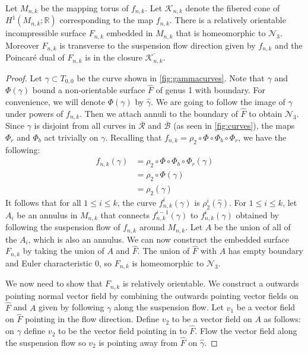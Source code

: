\begin{prop}
\label{lem:genus3}
Let $M_{n,k}$ be the mapping torus of $f_{n,k}$. Let $\mathcal{K}_{n,k}$ denote the fibered cone of
$H^1(M_{n,k};\mathbb{R})$ corresponding to the map $f_{n,k}$.
There is a relatively orientable incompressible surface $F_{n,k}$ embedded in $M_{n,k}$ that is homeomorphic to $\mathcal{N}_3$.
Moreover $F_{n,k}$ is transverse to the suspension flow direction given by $f_{n,k}$ and the Poincar\'e dual of $F_{n,k}$ is in
the closure $\overline{\mathcal{K}_{n,k}}$.
\end{prop}
\begin{proof}
  Let $\gamma \subset T_{0,0}$ be the curve shown in \autoref{fig:gammacurves}. Note that $\gamma$ and $\Phi(\gamma)$ bound a non-orientable surface
  $\widehat{F}$ of genus 1 with boundary. For convenience, we will denote $\Phi(\gamma)$ by $\widehat{\gamma}$. We are going to follow the image of $\gamma$
  under powers of $f_{n,k}$.  Then we attach annuli to the
  boundary of $\widehat{F}$ to obtain $\mathcal{N}_3$. Since $\gamma$ is disjoint from all curves in $\overline{\mathcal{R}}$ and $\overline{\mathcal{B}}$ (as seen in \autoref{fig:curves}), the maps $\Phi_r$ and $\Phi_b$ act trivially on $\gamma$.  Recalling that $f_{n,k}=\rho_2\circ\Phi\circ\Phi_b\circ\Phi_r$, we have the following:
  \begin{align*}
    f_{n,k}(\gamma) &= \rho_2 \circ \Phi \circ \Phi_b \circ \Phi_r(\gamma) \\
                    &= \rho_2 \circ \Phi(\gamma) \\
                    &= \rho_2(\widehat{\gamma}) 
  \end{align*}
  It follows that for all $1\leq i\leq k$, the curve $f_{n,k}^i(\gamma)$ is $\rho_2^i(\widehat{\gamma})$.
  For $1\leq i\leq k$, let $A_i$ be an annulus in $M_{n,k}$ that connects $f_{n,k}^{i-1}(\gamma)$ to $f_{n,k}^i(\gamma)$ obtained by following the suspension
  flow of $f_{n,k}$ around $M_{n,k}$. Let $A$ be the union of all of the $A_i$, which is also an annulus.  We can now construct the embedded surface $F_{n,k}$ by taking the union of
  $A$ and $\widehat{F}$. The union of $\widehat{F}$ with $A$ has empty boundary and Euler characteristic 0, so $F_{n,k}$ is homeomorphic to $\mathcal{N}_3$.


  We now need to show that $F_{n,k}$ is relatively orientable. We construct a outwards pointing normal vector field by combining the outwards pointing vector fields on $\widehat{F}$ and $A$ given by following $\gamma$ along the suspension flow.  Let $v_1$ be a vector field on $\widehat{F}$ pointing in the flow direction.  Define $v_2$ to be a vector field on $A$ as follows: on $\gamma$ define $v_2$ to be the vector field pointing in to $\widehat{F}$.  Flow the vector field along the suspension flow so $v_2$ is pointing away from $\widehat{F}$ on $\widehat{\gamma}$.
  

\end{proof}
